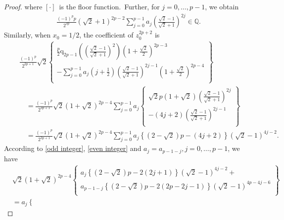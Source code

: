 \documentclass[11pt]{article}
\theoremstyle{plain}
\theoremstyle{definition}
\begin{document}
\begin{proof}
where $ [\cdot ]$ is the floor function. Further, for $j=0,\ldots,p-1$, we obtain
\begin{align}\label{Q1}
\frac{\left( -1 \right) ^pp}{2^{3p}}\left( \sqrt{2}+1 \right) ^{2p-2}\sum_{j=0}^{p-1}{a_j\left( \frac{\sqrt{2}-1}{\sqrt{2}+1} \right) ^{2j}}\in \mathbb{Q}.
\end{align}
Similarly, when $x_0=1/2$, the coefficient of $z_{0}^{2p+2}$ is
\begin{align}
&\quad\frac{\left( -1 \right) ^p}{2^{2p+1}}\sqrt{2}\left\{ \begin{array}{c}
\frac{p}{2}\mathrm{q}_{2p-1}\left( \left( \frac{\sqrt{2}-1}{\sqrt{2}+1} \right) ^2 \right) \left( 1+\frac{\sqrt{2}}{2} \right) ^{2p-3}\\
-\sum_{j=0}^{p-1}{a_j}\left( j+\frac{1}{2} \right) \left( \frac{\sqrt{2}-1}{\sqrt{2}+1} \right) ^{2j-1}\left( 1+\frac{\sqrt{2}}{2} \right) ^{2p-4}\\
\end{array} \right\}
\nonumber\\
&\quad \quad =
\frac{\left( -1 \right) ^p}{2^{3p+1}}\sqrt{2}\left( 1+\sqrt{2} \right) ^{2p-4}\sum_{j=0}^{p-1}{a_j}\left\{ \begin{array}{c}
\sqrt{2}p\left( 1+\sqrt{2} \right) \left( \frac{\sqrt{2}-1}{\sqrt{2}+1} \right) ^{2j}\\
-\left(4j+2 \right) \left( \frac{\sqrt{2}-1}{\sqrt{2}+1} \right) ^{2j-1}\\
\end{array} \right\}
\nonumber\\
&\quad \quad=
\frac{\left( -1 \right) ^p}{2^{3p+1}}\sqrt{2}\left( 1+\sqrt{2} \right) ^{2p-4}\sum_{j=0}^{p-1}{a_j}\left\{ \left( 2-\sqrt{2} \right) p-\left( 4j+2 \right) \right\} \left( \sqrt{2}-1 \right) ^{4j-2}.
\end{align}
According to \eqref{odd integer}, \eqref{even integer} and $a_j=a_{p-1-j},j=0,\ldots,p-1$, we have
\begin{align}
&\sqrt{2}\left( 1+\sqrt{2} \right) ^{2p-4}\left\{ \begin{array}{c}
	a_j\left\{ \left( 2-\sqrt{2} \right) p-2\left( 2j+1 \right) \right\} \left( \sqrt{2}-1 \right) ^{4j-2}+\\
	a_{p-1-j}\left\{ \left( 2-\sqrt{2} \right) p-2\left( 2p-2j-1 \right) \right\} \left( \sqrt{2}-1 \right) ^{4p-4j-6}\\
\end{array} \right\} 
\nonumber\\
&
=a_j\left\{ \begin{array}{c}

\end{array}
\end{align}
\end{proof}
\end{document}
